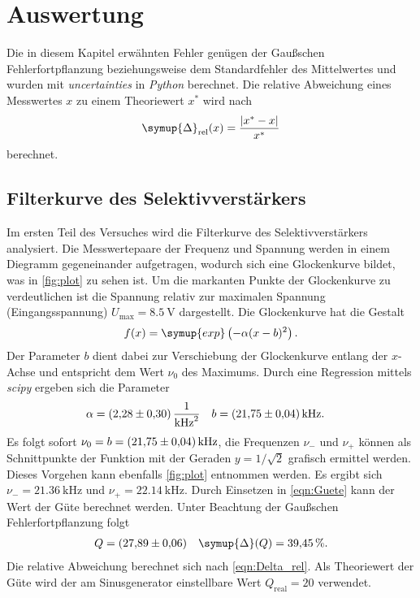 \section{Auswertung}
\label{sec:Auswertung}
Die in diesem Kapitel erwähnten Fehler genügen der Gaußschen Fehlerfortpflanzung beziehungsweise dem Standardfehler des Mittelwertes und wurden mit \textit{uncertainties}
\cite{uncertainties} in \textit{Python} berechnet. Die relative Abweichung eines Messwertes $x$ zu einem Theoriewert $x^*$ wird nach 
\begin{equation}
  \label{eqn:Delta_rel}
  \symup{\Delta}_\text{rel}(x) = \frac{|x^* - x|}{x^*}
\end{equation}
berechnet.

\subsection{Filterkurve des Selektivverstärkers}
\label{subsec:A_Filterkurve}
Im ersten Teil des Versuches wird die Filterkurve des Selektivverstärkers analysiert. Die Messwertepaare der Frequenz und Spannung werden in einem Diegramm gegeneinander
aufgetragen, wodurch sich eine Glockenkurve bildet, was in \autoref{fig:plot} zu sehen ist. Um die markanten Punkte der Glockenkurve zu verdeutlichen ist die Spannung 
relativ zur maximalen Spannung (Eingangsspannung) $U_\text{max} = \qty{8.5}{\volt}$ dargestellt. 
Die Glockenkurve hat die Gestalt
\begin{equation*}
  \label{eqn:Gaussglocke}
  f(x) = \symup{exp}\left(-\alpha(x-b)^2\right).
\end{equation*}
Der Parameter $b$ dient dabei zur Verschiebung der Glockenkurve entlang der $x$-Achse und entspricht dem Wert $\nu_0$ des Maximums. 
Durch eine Regression mittels \textit{scipy} \cite{scipy} ergeben sich die Parameter
\begin{align}
  \label{eqn:Parameter}
  \alpha &= \qty{2.28 +- 0.3}{\per\kilo\hertz\squared} & b &= \qty{21.75 +- 0.04}{\kilo\hertz}.
\end{align}
Es folgt sofort $\nu_0 = b = \qty{21.75 +- 0.04}{\kilo\hertz}$, die Frequenzen $\nu_-$ und $\nu_+$ können als Schnittpunkte der Funktion mit der Geraden $y = 1/\sqrt{2}$
grafisch ermittel werden. Dieses Vorgehen kann ebenfalls \autoref{fig:plot} entnommen werden. 
Es ergibt sich $\nu_- = \qty{21.36}{\kilo\hertz}$ und $\nu_+ = \qty{22.14}{\kilo\hertz}$. 
Durch Einsetzen in \autoref{eqn:Guete} kann der Wert der Güte berechnet werden.
Unter Beachtung der Gaußschen Fehlerfortpflanzung folgt
\begin{align*}
  Q &= \qty{27.89 +- 0.06}{} & \symup{\Delta}(Q) = \qty{39.45}{\percent}.
\end{align*}
Die relative Abweichung berechnet sich nach \autoref{eqn:Delta_rel}. Als Theoriewert der Güte wird der am Sinusgenerator einstellbare Wert $Q_\text{real} = 20$ verwendet.

